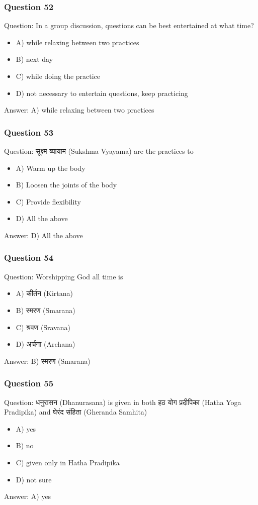 \begin{frame}[fragile]\frametitle{Question 52}
Question: In a group discussion, questions can be best entertained at what time?
\begin{itemize}
\item A) while relaxing between two practices
\item B) next day
\item C) while doing the practice
\item D) not necessary to entertain questions, keep practicing
\end{itemize}
Answer: A) while relaxing between two practices
\end{frame}

\begin{frame}[fragile]\frametitle{Question 53}
Question: सूक्ष्म व्यायाम (Sukshma Vyayama) are the practices to
\begin{itemize}
\item A) Warm up the body
\item B) Loosen the joints of the body
\item C) Provide flexibility
\item D) All the above
\end{itemize}
Answer: D) All the above
\end{frame}

\begin{frame}[fragile]\frametitle{Question 54}
Question: Worshipping God all time is
\begin{itemize}
\item A) कीर्तन (Kirtana)
\item B) स्मरण (Smarana)
\item C) श्रवण (Sravana)
\item D) अर्चना (Archana)
\end{itemize}
Answer: B) स्मरण (Smarana)
\end{frame}

\begin{frame}[fragile]\frametitle{Question 55}
Question: धनुरासन (Dhanurasana) is given in both हठ योग प्रदीपिका (Hatha Yoga Pradipika) and घेरंद संहिता (Gheranda Samhita)
\begin{itemize}
\item A) yes
\item B) no
\item C) given only in Hatha Pradipika
\item D) not sure
\end{itemize}
Answer: A) yes
\end{frame}

